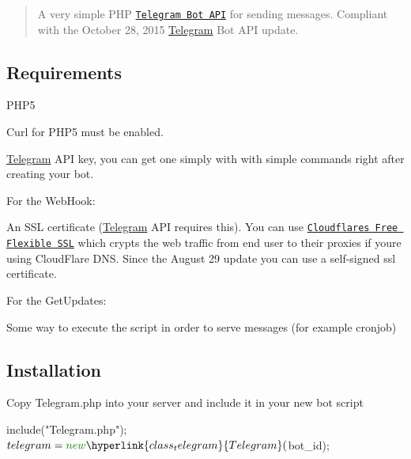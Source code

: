 \begin{quote}
A very simple P\+H\+P \href{https://core.telegram.org/bots}{\tt Telegram Bot A\+P\+I} for sending messages. Compliant with the October 28, 2015 \hyperlink{class_telegram}{Telegram} Bot A\+P\+I update. \end{quote}


\subsection*{Requirements }


\begin{DoxyItemize}
\item P\+H\+P5
\item Curl for P\+H\+P5 must be enabled.
\item \hyperlink{class_telegram}{Telegram} A\+P\+I key, you can get one simply with \href{https://core.telegram.org/bots#botfather}{\tt } with simple commands right after creating your bot.
\end{DoxyItemize}

For the Web\+Hook\+:
\begin{DoxyItemize}
\item An S\+S\+L certificate (\hyperlink{class_telegram}{Telegram} A\+P\+I requires this). You can use \href{https://www.cloudflare.com/ssl}{\tt Cloudflare\textquotesingle{}s Free Flexible S\+S\+L} which crypts the web traffic from end user to their proxies if you\textquotesingle{}re using Cloud\+Flare D\+N\+S. Since the August 29 update you can use a self-\/signed ssl certificate.
\end{DoxyItemize}

For the Get\+Updates\+:
\begin{DoxyItemize}
\item Some way to execute the script in order to serve messages (for example cronjob)
\end{DoxyItemize}

\subsection*{Installation }


\begin{DoxyItemize}
\item Copy Telegram.\+php into your server and include it in your new bot script 
\begin{DoxyCode}
include(\textcolor{stringliteral}{"Telegram.php"});
$telegram = \textcolor{keyword}{new} \hyperlink{class_telegram}{Telegram}($bot\_id);
\end{DoxyCode}

\end{DoxyItemize}

